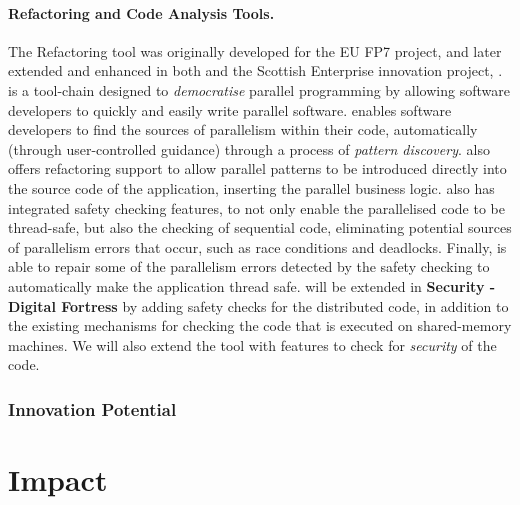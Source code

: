 \documentclass[a4paper,11pt]{article}
\newcommand{\project}[1]{\textbf{#1}\xspace}
\newcommand{\SECURITY}{\project{Security - Digital Fortress}}
\newcommand{\TheProject}{\SECURITY}
\begin{document}
\paragraph{\SAshort{} \paraformance Refactoring and Code Analysis Tools.}


The \paraformance Refactoring tool was originally developed for the EU FP7 \paraphrase{} project, and later extended and enhanced in both \rephrase{} and the Scottish Enterprise innovation project, \paraformance{}. 
\paraformance is a tool-chain designed to \emph{democratise} parallel programming by allowing software developers to quickly and easily write parallel software. \paraformance enables software developers to find the sources of parallelism within their code, automatically (through user-controlled guidance) through a process of \emph{pattern discovery}. \paraformance also offers refactoring support to allow parallel patterns to be introduced directly into the source code of the application, inserting the parallel business logic. \paraformance also has integrated safety checking features, to not only enable  the parallelised code to be thread-safe, but also the checking of sequential code, eliminating potential sources of parallelism errors that occur, such as race conditions and deadlocks. Finally, \paraformance is able to repair some of the parallelism errors detected by the safety checking to automatically make the application thread safe. \paraformance will be extended in \TheProject{} by adding safety checks for the distributed code, in addition to the existing mechanisms for checking the code that is executed on shared-memory machines. We will also extend the tool with features to check for \emph{security} of the code. 


\subsubsection{Innovation Potential}
\label{sec:innovationpotential}
\label{innovationpotential}


\clearpage
\section{Impact}
\label{sec:impact}

\end{document}
